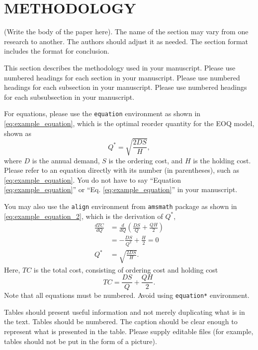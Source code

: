 \documentclass[preprint]{oscmjournal}
\begin{document}
\section{METHODOLOGY}\label{sec:methodology}
(Write the body of the paper here). The name of the section may vary from one research to another. The authors should adjust it as needed. The section format includes the format for conclusion. 

This section describes the methodology used in your manuscript. Please use numbered headings for each section in your manuscript. Please use numbered headings for each subsection in your manuscript. Please use numbered headings for each subsubsection in your manuscript. 

For equations, please use the \texttt{equation} environment as shown in \eqref{eq:example_equation}, which is the optimal reorder quantity for the EOQ model, shown as
\begin{equation}\label{eq:example_equation}
    Q^* = \sqrt{\frac{2DS}{H}},
\end{equation}
where $D$ is the annual demand, $S$ is the ordering cost, and $H$ is the holding cost. Please refer to an equation directly with its number (in parentheses), such as \eqref{eq:example_equation}. You do not have to say ``Equation \eqref{eq:example_equation}'' or ``Eq. \eqref{eq:example_equation}'' in your manuscript.

You may also use the \texttt{align} environment from \texttt{amsmath} package as shown in \ref{eq:example_equation_2}, which is the derivation of $Q^*$, 
\begin{align}\label{eq:example_equation_2}
    \frac{dTC}{dQ} &= \frac{d}{dQ}\left(\frac{DS}{Q} + \frac{QH}{2}\right)  \\
    &= -\frac{DS}{Q^2} + \frac{H}{2} = 0  \\
    Q^* &= \sqrt{\frac{2DS}{H}}.
\end{align}
Here, $TC$ is the total cost, consisting of ordering cost and holding cost
\begin{equation}
    TC = \frac{DS}{Q} + \frac{QH}{2}.
\end{equation}
Note that all equations must be numbered. Avoid using \texttt{equation*} environment. 

Tables should present useful information and not merely duplicating what is in the text. Tables should be numbered. The caption should be clear enough to represent what is presented in the table. Please supply editable files (for example, tables should not be put in the form of a picture). 
\end{document}
